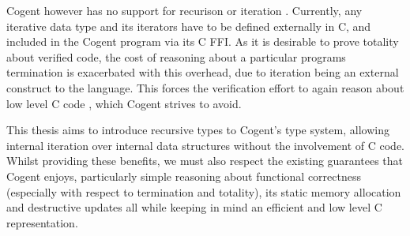 Cogent however has no support for recurison or iteration . 
Currently, any iterative data type and its iterators have to be defined externally in C,
  and included in the Cogent program via its C FFI.
As it is desirable to prove totality about verified code,
  the cost of reasoning about a particular programs termination is exacerbated with this overhead,
  due to iteration being an external construct to the language.
This forces the verification effort to again reason about low level C code , which Cogent strives to avoid.

This thesis aims to introduce recursive types to Cogent's type system, allowing internal iteration over
  internal data structures without the involvement of C code.
Whilst providing these benefits, we must also respect the existing guarantees that Cogent enjoys,
  particularly simple reasoning about functional correctness (especially with respect to termination and totality),
  its static memory allocation and destructive updates all while keeping in mind
  an efficient and low level C representation.